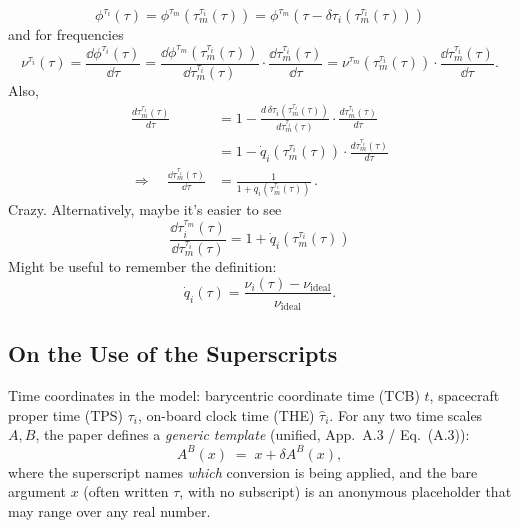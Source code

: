 \documentclass[11pt]{article}
\begin{document}
\begin{equation*}
    \phi^{\tau_i}(\tau)=\phi^{\tau_m}(\tau_m^{\tau_i}(\tau)) = \phi^{\tau_m}(\tau-\delta\tau_i(\tau_m^{\tau_i}(\tau)))
\end{equation*}
and for frequencies
\begin{equation*}
    \nu^{\tau_i}(\tau)=\frac{\dd \phi^{\tau_i}(\tau)}{\dd \tau}=\frac{\dd \phi^{\tau_m}(\tau_m^{\tau_i}(\tau))}{\dd \tau_m^{\tau_i}(\tau)}\cdot \frac{\dd \tau_m^{\tau_i}(\tau)}{\dd \tau} = \nu^{\tau_m}(\tau_m^{\tau_i}(\tau)) \cdot \frac{\dd \tau_m^{\tau_i}(\tau)}{\dd \tau}.
\end{equation*}
Also,
\begin{align*}
\frac{d\tau_m^{\tau_i}(\tau)}{d\tau}
&= 1 - \frac{d\,\delta\tau_i\!\left(\tau_m^{\tau_i}(\tau)\right)}{d\tau_m^{\tau_i}(\tau)}
    \cdot \frac{d\tau_m^{\tau_i}(\tau)}{d\tau}\\[6pt]
&= 1 - \dot q_i\!\left(\tau_m^{\tau_i}(\tau)\right)
    \cdot \frac{d\tau_m^{\tau_i}(\tau)}{d\tau}\\[6pt]
\Rightarrow\quad
\frac{\dd\tau_m^{\tau_i}(\tau)}{\dd\tau}
&= \frac{1}{1 + \dot q_i\!\left(\tau_m^{\tau_i}(\tau)\right)} \, .
\end{align*}
Crazy. Alternatively, maybe it's easier to see
\begin{equation*}
    \frac{\dd\tau_i^{\tau_m}(\tau)}{\dd\tau_m^{\tau_i}(\tau)}=1 + \dot q_i\!\left(\tau_m^{\tau_i}(\tau)\right)
\end{equation*}
Might be useful to remember the definition:
\begin{equation*}
    \dot q_i(\tau)
=
\frac{\nu_i(\tau) - \nu_{\mathrm{ideal}}}{\nu_{\mathrm{ideal}}}.
\end{equation*}

\subsection{On the Use of the Superscripts}

Time coordinates in the model: barycentric coordinate time (TCB) $t$,
spacecraft proper time (TPS) $\tau_i$, on-board clock time (THE) $\hat\tau_i$.
For any two time scales $A,B$, the paper defines a \emph{generic template}
(unified, App.\ A.3 / Eq.~(A.3)):
\begin{equation*}
  A^B(x) \;=\; x + \delta A^B(x), \tag{def}
\end{equation*}
where the superscript names \emph{which} conversion is being applied,
and the bare argument $x$ (often written $\tau$, with no subscript)
is an anonymous placeholder that may range over any real number.
\end{document}
